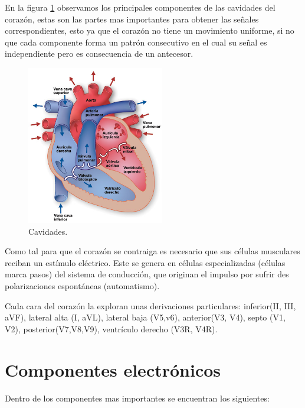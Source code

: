En la figura \ref{cavi} observamos los principales componentes de las cavidades del corazón, estas son las partes mas importantes para obtener las señales correspondientes, esto ya que el corazón no tiene un movimiento  uniforme, si no que cada componente forma un patrón consecutivo en el cual su señal es independiente pero es consecuencia de un antecesor.

\begin{figure}[H]
   	\centering
		\includegraphics[width=6cm]{imag/cavidad.jpg}
		\caption{Cavidades.}
		\label{cavi}
\end{figure}


Como tal para que el corazón se contraiga es necesario que sus células musculares reciban un estímulo eléctrico. Este se genera en células especializadas (células marca pasos) del sistema de conducción, que originan el impulso por sufrir des polarizaciones espontáneas (automatismo).\newline

Cada cara del corazón la exploran unas derivaciones particulares: inferior(II, III, aVF), lateral alta (I, aVL), lateral baja (V5,v6), anterior(V3, V4), septo (V1, V2), posterior(V7,V8,V9), ventrículo derecho (V3R, V4R).
\chapter{Componentes electrónicos}
Dentro de los componentes mas importantes se encuentran los siguientes:\newline

